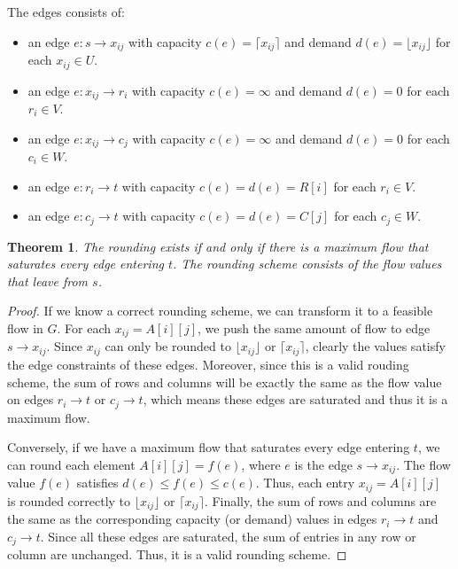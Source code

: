 \documentclass[letterpaper,11pt]{article}
\newtheorem{theorem}{Theorem}
\begin{document}
\begin{enumerate}
\begin{solution}
  The edges consists of:
  \begin{itemize}
    \item an edge $e: s \rightarrow x_{ij}$ with capacity $c(e)=\lceil x_{ij}
      \rceil$ and demand $d(e) = \lfloor x_{ij} \rfloor$ for each $x_{ij} \in U$.  
    \item an edge $e: x_{ij}\rightarrow r_i$ with capacity $c(e)=\infty$ and
      demand $d(e)=0$ for each $r_i \in V$.
    \item
      an edge $e: x_{ij} \rightarrow c_j$ with capacity $c(e)=\infty$ and
      demand $d(e)=0$ for each $c_i \in W$.
    \item an edge $e: r_i \rightarrow t$ with capacity $c(e)=d(e)=R[i]$ 
      for each $r_i \in V$.
    \item an edge $e: c_j \rightarrow t$ with capacity $c(e)=d(e)=C[j]$ 
      for each $c_j \in W$.
  \end{itemize} 

  \begin{theorem}
    The rounding exists if and only if there is a maximum flow that saturates
    every edge entering $t$. The rounding scheme consists of 
    the flow values that leave from $s$.
  \end{theorem}
  \begin{proof}
    If we know a correct rounding scheme, we can transform it to a feasible
    flow in $G$. For each $x_{ij}=A[i][j]$, we push the same amount of flow to
    edge $s \rightarrow x_{ij}$. Since $x_{ij}$ can only be rounded to $\lfloor
    x_{ij} \rfloor$ or $\lceil x_{ij} \rceil$, clearly the values satisfy the
    edge constraints of these edges.  Moreover, since this is a valid rouding
    scheme, the sum of rows and columns will be exactly the same as the flow
    value on edges $r_i \rightarrow t$ or $c_j \rightarrow t$, which means
    these edges are saturated and thus it is a maximum flow.

    Conversely, if we have a maximum flow that saturates every edge entering
    $t$, we can round each element $A[i][j]=f(e)$, where $e$ is the edge
    $s\rightarrow  x_{ij}$. The flow value $f(e)$ satisfies 
    $d(e) \leq f(e) \leq c(e)$. Thus, each entry $x_{ij}=A[i][j]$ is rounded
    correctly to $\lfloor x_{ij} \rfloor$ or $\lceil x_{ij} \rceil$.
    Finally, the sum of rows and columns are the same as the 
    corresponding capacity (or demand) values in edges $r_i \rightarrow t$ and 
    $c_j \rightarrow t$. Since all these edges are saturated, the sum of entries
    in any row or column are unchanged.
    Thus, it is a valid rounding scheme.
  \end{proof}


\end{solution}
\end{enumerate}
\end{document}

